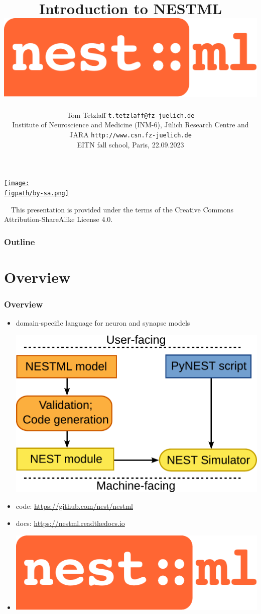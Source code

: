 \documentclass[8pt,t,usepdftitle=false]{beamer}
\title{%
  {\LARGE\bf Introduction to NESTML}
  \hfill\includegraphics[width=0.15\linewidth]{./figures/nestml-logo}\\[1ex]
}
\subtitle{%
  {\normalsize\mdseries Tom Tetzlaff}%
  {\hfill\tiny\texttt{t.tetzlaff@fz-juelich.de}}\\  
  {\footnotesize\mdseries Institute of Neuroscience and Medicine (INM-6), J\"ulich Research Centre and JARA}
  {\hfill\tiny\texttt{http://www.csn.fz-juelich.de}}
  \\
  {\tiny\mdseries EITN fall school, Paris, 22.09.2023}
}
\date{}
\author{}
\institute{}
\def\figpath{./figures}
\begin{document}
\maketitle

\begin{frame}[plain]
  \begin{center}
    \parbox{0.9\linewidth}{
      \vspace{0.95\textheight}
      \parbox[c]{0.1\linewidth}{%
        \href{https://creativecommons.org/licenses/by-sa/4.0}{%
          \texttt{[image: \\figpath/by-sa.png]}}}
      \parbox[c]{0.9\linewidth}{\scriptsize%
        ~~{}This presentation is provided under the terms of the Creative Commons Attribution-ShareAlike License 4.0.
      }
    }    
  \end{center}
\end{frame}
\def\ttl{Outline}
\begin{frame}[plain]
  \frametitle{\ttl}
  \tableofcontents
\end{frame}
\def\ttl{Overview}\section{\ttl}
\begin{frame}[t,plain]
  \frametitle{\ttl}
  \begin{itemize}
  \item domain-specific language for neuron and synapse models\\[3ex]    
    \begin{center}
      \includegraphics[width=0.7\linewidth]{./figures/nestml-workflow.pdf}
    \end{center}
    \vspace*{4ex}
  \item code: \url{https://github.com/nest/nestml}
  \item docs: \url{https://nestml.readthedocs.io}
  \item[] \vspace*{-5ex}\hfill\includegraphics[width=0.2\linewidth]{./figures/nestml-logo.pdf}
  \end{itemize}
\end{frame}
\end{document}
